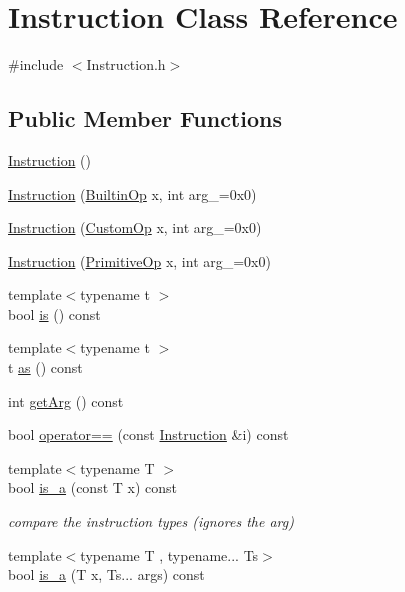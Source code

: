 \hypertarget{class_instruction}{}\section{Instruction Class Reference}
\label{class_instruction}


{\ttfamily \#include $<$Instruction.\+h$>$}

\subsection*{Public Member Functions}
\begin{DoxyCompactItemize}
\item 
\hyperlink{class_instruction_aebd15229c1651af49dcb203707e7a2d5}{Instruction} ()
\item 
\hyperlink{class_instruction_a7f672d88ba4ec174716bbac9adb8b1b0}{Instruction} (\hyperlink{_instruction_8h_af2fb7c87c5854c5733d7bb0506b06de7}{Builtin\+Op} x, int arg\+\_\+=0x0)
\item 
\hyperlink{class_instruction_afbd8f0bdce88feee59e23abf82c8a718}{Instruction} (\hyperlink{_instruction_8h_a3a20ca4a8f0ab220518b030cc23ffee4}{Custom\+Op} x, int arg\+\_\+=0x0)
\item 
\hyperlink{class_instruction_a62d7782f809fa55635a6ced1e971eb3b}{Instruction} (\hyperlink{_instruction_8h_a227278394efd1e2313c727102db09ea9}{Primitive\+Op} x, int arg\+\_\+=0x0)
\item 
{\footnotesize template$<$typename t $>$ }\\bool \hyperlink{class_instruction_ade73e12471250fd191362d462e2f4970}{is} () const
\item 
{\footnotesize template$<$typename t $>$ }\\t \hyperlink{class_instruction_ac99272000afeb9015a9d40ceed8c139b}{as} () const
\item 
int \hyperlink{class_instruction_a83a2763aa1dab5281b27dd99925f683e}{get\+Arg} () const
\item 
bool \hyperlink{class_instruction_a75e0ecee9ec917bcc47488a1fbeb6a24}{operator==} (const \hyperlink{class_instruction}{Instruction} \&i) const
\item 
{\footnotesize template$<$typename T $>$ }\\bool \hyperlink{class_instruction_a924203cd9a0516d64556ecbf6a79df8a}{is\+\_\+a} (const T x) const
\begin{DoxyCompactList}\small\item\em compare the instruction types (ignores the arg) \end{DoxyCompactList}\item 
{\footnotesize template$<$typename T , typename... Ts$>$ }\\bool \hyperlink{class_instruction_ae670ee58f9acdfd60b7213f77dfca794}{is\+\_\+a} (T x, Ts... args) const
\end{DoxyCompactItemize}
